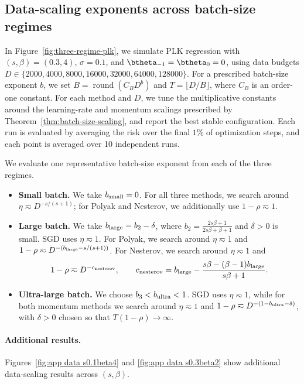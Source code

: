 \documentclass[11pt]{article}
\newcommand{\nesterov}{\mathrm{nesterov}}
\begin{document}
\subsection{Data-scaling exponents across batch-size regimes}
\label{app:data-scaling-experiments}

In Figure~\ref{fig:three-regime-plk}, we simulate PLK regression with \((s,\beta)=(0.3,4)\), \(\sigma=0.1\), and \(\btheta_{-1}=\btheta_0=0\), using data budgets \(D\in\{2000,4000,8000,16000,32000,64000,128000\}\). For a prescribed batch-size exponent \(b\), we set \(B=\operatorname{round}(C_BD^b)\) and \(T=\lfloor D/B\rfloor\), where \(C_B\) is an order-one constant. For each method and \(D\), we tune the multiplicative constants around the learning-rate and momentum scalings prescribed by Theorem~\ref{thm:batch-size-scaling}, and report the best stable configuration. Each run is evaluated by averaging the risk over the final \(1\%\) of optimization steps, and each point is averaged over 10 independent runs.

We evaluate one representative batch-size exponent from each of the three regimes.

\begin{itemize}
\item \textbf{Small batch.} We take \(b_{\rm small}=0\). For all three methods, we search around \(\eta\eqsim D^{-s/(s+1)}\); for Polyak and Nesterov, we additionally use \(1-\rho\eqsim1\).

\item \textbf{Large batch.} We take \(b_{\rm large}=b_2-\delta\), where \(b_2=\frac{2s\beta+1}{2s\beta+\beta+1}\) and \(\delta>0\) is small. SGD uses \(\eta\eqsim1\). For Polyak, we search around \(\eta\eqsim1\) and \(1-\rho\eqsim D^{-(b_{\rm large}-s/(s+1))}\). For Nesterov, we search around \(\eta\eqsim1\) and
\[
1-\rho\eqsim D^{-c_{\nesterov}},\qquad c_{\nesterov}=b_{\rm large}-\frac{s\beta-(\beta-1)b_{\rm large}}{s\beta+1}.
\]

\item \textbf{Ultra-large batch.} We choose \(b_3<b_{\rm ultra}<1\). SGD uses \(\eta\eqsim1\), while for both momentum methods we search around \(\eta\eqsim1\) and \(1-\rho\eqsim D^{-(1-b_{\rm ultra}-\delta)}\), with \(\delta>0\) chosen so that \(T(1-\rho)\to\infty\).
\end{itemize}

\paragraph{Additional results.} Figures~\ref{fig:app data s0.1beta4} and \ref{fig:app data s0.3beta2} show additional data-scaling results across \((s,\beta)\).
\end{document}
